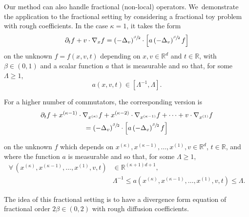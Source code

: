 \documentclass[JEP,XML,SOM,Unicode,NoFloatCountersInSection,published]{cedram}
\theoremstyle{definition}
\newcommand\R{{\mathbb R}}
\begin{document}
Our method can also handle fractional (non-local) operators. We~demonstrate the
application to the fractional setting by considering a fractional toy problem
with rough coefficients. In the case \(\kappa=1\), it takes the form
\begin{equation}
\label{eq:kolmo-nonloc}
\partial_t f + v \cdot \nabla_x f = \left(- \Delta_v
\right)^{\sfrac{\beta}{2}} \cdot \left[ a
\left(- \Delta_v \right)^{\sfrac{\beta}{2}} f \right]
\end{equation}
on the unknown $f=f(x,v,t)$ depending on $x,v \in \R^d$ and
$t \in \R$, with $\beta \in (0,1)$ and a scalar function $a$ that
is measurable and so that, for some $\Lambda \ge 1$,
\begin{equation}
\label{eq:ellip1-frac}
a(x,v,t) \in [\Lambda^{-1},\Lambda].
\end{equation}
\noindent
\begin{minipage}{\textwidth}
For a higher number of commutators, the corresponding version is
\begin{multline}
\label{eq:kolmo-nonloc-k}
\partial_t f + x^{(\kappa-1)} \cdot \nabla_{x^{(\kappa)}} f
+ x^{(\kappa-2)} \cdot \nabla_{x^{(\kappa-1)}} f +
\dots + v \cdot \nabla_{x^{(1)}} f\\
=
\left(- \Delta_v \right)^{\sfrac{\beta}{2}} \cdot \Bigl[ a
\left(- \Delta_v \right)^{\sfrac{\beta}{2}} f \Bigr]
\end{multline}
\end{minipage}
\par\smallskip\noindent
on the unknown $f$ which depends on
$x^{(\kappa)},x^{(\kappa-1)}, \dots, x^{(1)},v \in \R^d$,
$t \in \R$, and where the function $a$ is measurable and so that,
for some $\Lambda \ge 1$,
\begin{equation}
\begin{aligned}
\label{eq:ellipk}
\forall \, (x^{(\kappa)},x^{(\kappa-1)}, \dots, x^{(1)},v,t)
&\in \R^{(\kappa+1)d+1}, \\
&\Lambda^{-1} \le
a(x^{(\kappa)},x^{(\kappa-1)},\dots,x^{(1)},v,t) \le \Lambda.
\end{aligned}
\end{equation}

The idea of this fractional setting is to have a divergence form equation of
fractional order $2\beta \in (0, 2)$ with rough diffusion coefficients.
\end{document}
